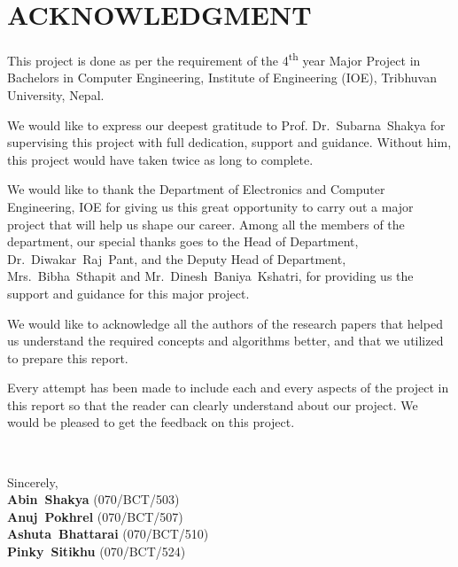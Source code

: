 

 {}
\section*{ACKNOWLEDGMENT}

This project is done as per the requirement of the 4\textsuperscript{th} year
Major Project in Bachelors in Computer Engineering, Institute of Engineering
(IOE), Tribhuvan University, Nepal.

We would like to express our deepest gratitude to Prof. Dr.~Subarna~Shakya for
supervising this project with full dedication, support and guidance. Without
him, this project would have taken twice as long to complete.

We would like to thank the Department of Electronics and Computer
Engineering, IOE for giving us this great opportunity to carry out a major
project that will help us shape our career. Among all the members of the
department, our special thanks goes to the Head of Department,
Dr.~Diwakar~Raj~Pant, and the Deputy Head of Department, Mrs.~Bibha~Sthapit and
Mr.~Dinesh~Baniya~Kshatri, for providing us the support and guidance for this
major project.

We would like to acknowledge all the authors of the research papers that helped
us understand the required concepts and algorithms better, and that we utilized
to prepare this report.

Every attempt has been made to include each and every aspects of the project in
this report so that the reader can clearly understand about our project. We
would be pleased to get the feedback on this project.

~

Sincerely,\\
{\bf Abin~Shakya} (070/BCT/503)\\
{\bf Anuj~Pokhrel} (070/BCT/507)\\
{\bf Ashuta~Bhattarai} (070/BCT/510)\\
{\bf Pinky~Sitikhu} (070/BCT/524)\\
